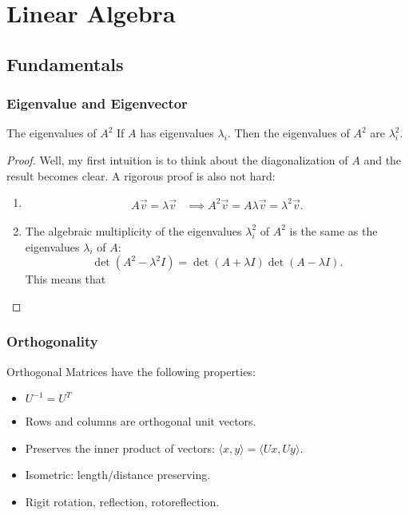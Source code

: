 \documentclass[../main]{subfiles}
\begin{document}
\chapter{Linear Algebra}
\section{Fundamentals}
\subsection{Eigenvalue and Eigenvector}
\begin{bbox}{The eigenvalues of $A^2$}
    If $A$ has eigenvalues $\lambda_i$. Then the eigenvalues of $A^2$ are $\lambda_i^2$.
    \begin{proof}
        Well, my first intuition is to think about the diagonalization of $A$ and the result becomes clear.
        \newline
        A rigorous proof is also not hard: 
        \begin{enumerate}
            \item \begin{align*}
                A\vec v = \lambda \vec v &\implies A^2 \vec v = A \lambda\vec v = \lambda^2 \vec v.
            \end{align*}
        \item 
            The algebraic multiplicity of the eigenvalues $\lambda^2_i$ of $A^2$ is the same as the eigenvalues $\lambda_i$ of $A$:
            \[
            \det (A^2 - \lambda^2 I) = \det (A+\lambda I)\det (A-\lambda I).
            \]
            This means that
        \end{enumerate}
    \end{proof}
\end{bbox}

\subsection{Orthogonality}
Orthogonal Matrices have the following properties:
\begin{itemize}
    \item $U^{-1}=U^T$
    \item Rows and columns are orthogonal unit vectors.
    \item Preserves the inner product of vectors: $\langle x,y\rangle = \langle Ux, Uy\rangle$.
    \item Isometric: length/distance preserving.
    \item Rigit rotation, reflection, rotoreflection.
\end{itemize}
\end{document}
